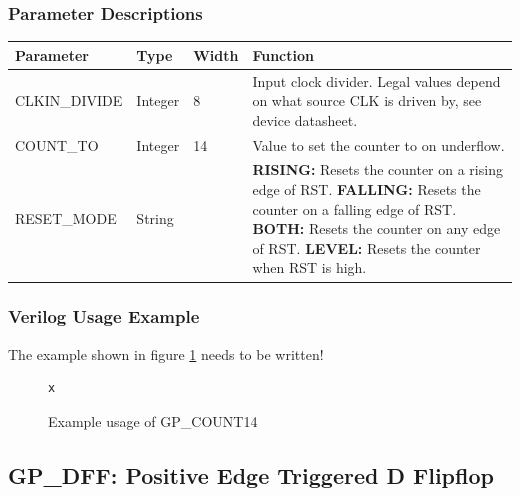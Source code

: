 \documentclass{article}
\begin{document}
\subsubsection{Parameter Descriptions}

\begin{tabularx}{5in}{|l|l|l|X|}
\hline
{\bfseries Parameter} & {\bfseries Type} & {\bfseries Width} & {\bfseries Function} \\
\hline
CLKIN\_DIVIDE & Integer & 8 &
	Input clock divider. Legal values depend on what source CLK is driven by, see device datasheet.\\
\hline
COUNT\_TO & Integer & 14 & Value to set the counter to on underflow. \\
\hline
RESET\_MODE & String &  & 
	{\bfseries RISING: } \newline Resets the counter on a rising edge of RST. \newline
	{\bfseries FALLING: } \newline Resets the counter on a falling edge of RST. \newline
	{\bfseries BOTH: } \newline Resets the counter on any edge of RST. \newline
	{\bfseries LEVEL: } \newline Resets the counter when RST is high. \\
\hline
\end{tabularx}

\subsubsection{Verilog Usage Example}

The example shown in figure \ref{gp-count14-example} needs to be written!

\begin{figure}[h]
\begin{lstlisting}
x
\end{lstlisting}
\caption{Example usage of GP\_COUNT14}
\label{gp-count14-example}
\end{figure}


\pagebreak
\subsection{GP\_DFF: Positive Edge Triggered D Flipflop}
\end{document}
